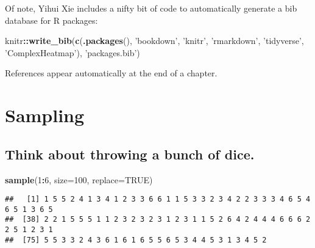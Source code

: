 \documentclass[]{book}
\newenvironment{Shaded}{\begin{snugshade}}{\end{snugshade}}
\newcommand{\DataTypeTok}[1]{\textcolor[rgb]{0.13,0.29,0.53}{#1}}
\newcommand{\DecValTok}[1]{\textcolor[rgb]{0.00,0.00,0.81}{#1}}
\newcommand{\KeywordTok}[1]{\textcolor[rgb]{0.13,0.29,0.53}{\textbf{#1}}}
\newcommand{\NormalTok}[1]{#1}
\newcommand{\OperatorTok}[1]{\textcolor[rgb]{0.81,0.36,0.00}{\textbf{#1}}}
\newcommand{\OtherTok}[1]{\textcolor[rgb]{0.56,0.35,0.01}{#1}}
\newcommand{\StringTok}[1]{\textcolor[rgb]{0.31,0.60,0.02}{#1}}
\begin{document}
Of note, Yihui Xie includes a nifty bit of code to automatically generate a bib database for R packages:

\begin{Shaded}
\begin{Highlighting}[]
\NormalTok{knitr}\OperatorTok{::}\KeywordTok{write_bib}\NormalTok{(}\KeywordTok{c}\NormalTok{(}\KeywordTok{.packages}\NormalTok{(), }\StringTok{'bookdown'}\NormalTok{, }\StringTok{'knitr'}\NormalTok{, }\StringTok{'rmarkdown'}\NormalTok{, }\StringTok{'tidyverse'}\NormalTok{, }\StringTok{'ComplexHeatmap'}\NormalTok{), }\StringTok{'packages.bib'}\NormalTok{)}
\end{Highlighting}
\end{Shaded}

References appear automatically at the end of a chapter.

\hypertarget{sampling}{%
\chapter{Sampling}\label{sampling}}

\hypertarget{think-about-throwing-a-bunch-of-dice.}{%
\section{Think about throwing a bunch of dice.}\label{think-about-throwing-a-bunch-of-dice.}}

\begin{Shaded}
\begin{Highlighting}[]
\KeywordTok{sample}\NormalTok{(}\DecValTok{1}\OperatorTok{:}\DecValTok{6}\NormalTok{, }\DataTypeTok{size=}\DecValTok{100}\NormalTok{, }\DataTypeTok{replace=}\OtherTok{TRUE}\NormalTok{) }
\end{Highlighting}
\end{Shaded}

\begin{verbatim}
##   [1] 1 5 5 2 4 1 3 4 1 2 3 3 6 6 1 1 5 3 3 2 3 4 2 2 3 3 3 4 6 5 4 6 5 1 3 6 5
##  [38] 2 2 1 5 5 5 1 1 2 3 2 3 2 3 1 2 3 1 1 5 2 6 4 2 4 4 4 6 6 6 2 2 5 1 2 3 1
##  [75] 5 5 3 3 2 4 3 6 1 6 1 6 5 5 6 5 3 4 4 5 3 1 3 4 5 2
\end{verbatim}

\begin{Shaded}
\end{Shaded}
\end{document}
